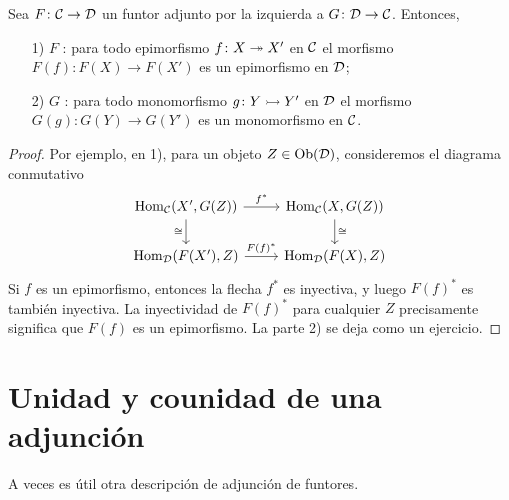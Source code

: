 \documentclass{article}
\numberwithin{equation}{section}
\theoremstyle{definition}
\begin{document}
\begin{proposicion}
  Sea $F\colon \mathcal{C} \to \mathcal{D}$ un funtor adjunto por la izquierda a
  $G\colon \mathcal{D}\to \mathcal{C}$. Entonces,

  \begin{enumerate}
  \item[1)] $F$ : para todo epimorfismo
    $f\colon X\twoheadrightarrow X'$ en $\mathcal{C}$ el morfismo $F (f)\colon F(X) \to F(X')$
    es un epimorfismo en $\mathcal{D}$;

  \item[2)] $G$ : para todo monomorfismo
    $g\colon Y\rightarrowtail Y'$ en $\mathcal{D}$ el morfismo $G (g)\colon G(Y) \to G(Y')$
    es un monomorfismo en $\mathcal{C}$.
  \end{enumerate}

  \begin{proof}
    Por ejemplo, en 1), para un objeto $Z \in \operatorname{Ob} (\mathcal{D})$, consideremos
    el diagrama conmutativo
    $$\begin{tikzcd}
      \Hom_\vcateg{C} (X', G (Z)) \ar{r}{f^*}\ar{d}[swap]{\isom} & \Hom_\vcateg{C} (X, G (Z))\ar{d}{\isom} \\
      \Hom_\vcateg{D} (F (X'), Z) \ar{r}{F (f)^*} & \Hom_\vcateg{D} (F (X), Z)
    \end{tikzcd}$$
    Si $f$ es un epimorfismo, entonces la flecha $f^*$ es inyectiva, y luego
    $F (f)^*$ es también inyectiva. La inyectividad de $F (f)^*$ para cualquier
    $Z$ precisamente significa que $F (f)$ es un epimorfismo. La parte 2) se
    deja como un ejercicio.
  \end{proof}
\end{proposicion}


\section{Unidad y counidad de una adjunción}

A veces es útil otra descripción de adjunción de funtores.
\end{document}
